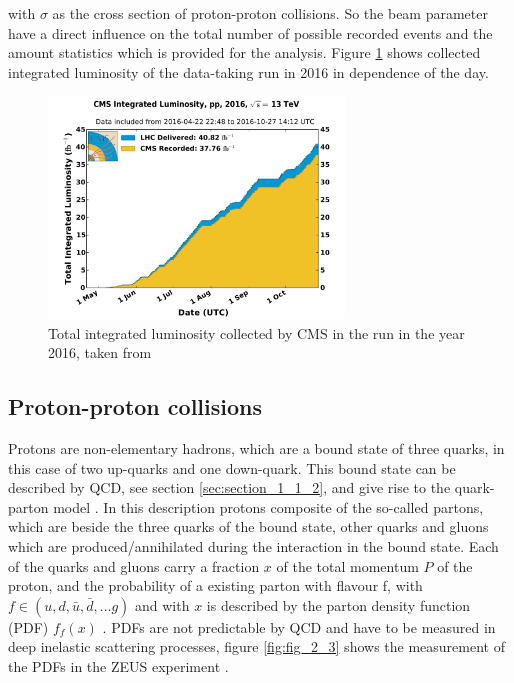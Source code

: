 with $\sigma$ as the cross section of proton-proton collisions. So the beam parameter have a direct influence on the total number of possible recorded events and the amount statistics which is provided for the analysis. Figure \ref{fig:fig_2_2} shows collected integrated luminosity of the data-taking run in 2016 in dependence of the day. 

\begin{figure}[ht]
	\centering
	\includegraphics[width=0.7\textwidth]{pictures/int_lumi_per_day_cumulative_pp_2016.pdf}

	\caption[Total integrated luminosity of the year 2016]{Total integrated luminosity collected by \acs{CMS} in the run in the year 2016, taken from \cite{CMSLUMI}}
	\label{fig:fig_2_2}
\end{figure}


\subsection{Proton-proton collisions}
\label{sec:section_2_1_2}

Protons are non-elementary hadrons, which are a bound state of three quarks, in this case of two up-quarks and one down-quark. This bound state can be described by \acs{QCD}, see section \ref{sec:section_1_1_2}, and give rise to the quark-parton model \cite{Peskin}. In this description protons composite of the so-called partons, which are beside the three quarks of the bound state, other quarks and gluons which are produced/annihilated during the interaction in the bound state. Each of the quarks and gluons carry a fraction $x$ of the total momentum $P$ of the proton, and the probability of a existing parton with flavour f, with $f \in (u, d, \bar{u}, \bar{d}, ... g)$ and with $x$ is described by the parton density function (\acs{PDF}) $f_{f}(x)$ \cite{Peskin, PDF1}. \acsp{PDF} are not predictable by \acs{QCD} and have to be measured in deep inelastic scattering processes, figure \ref{fig:fig_2_3} shows the measurement of the \acsp{PDF} in the ZEUS experiment \cite{ZEUS}. \\

